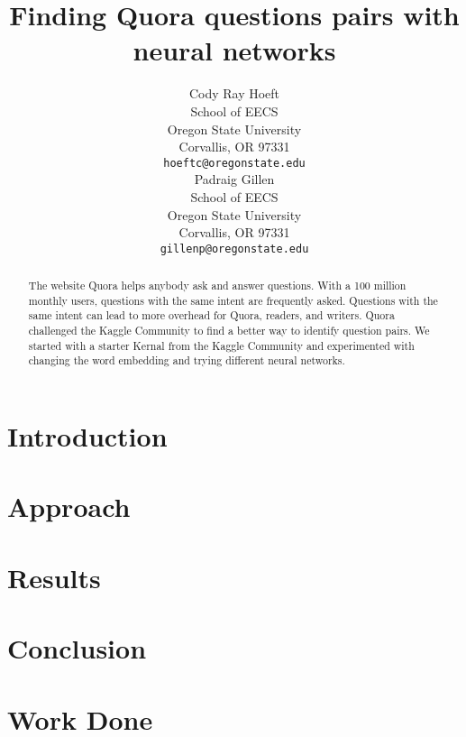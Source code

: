 \documentclass{article}
\title{Finding Quora questions pairs with neural networks}
\author{
    Cody Ray Hoeft \\
    School of EECS \\
    Oregon State University \\
    Corvallis, OR 97331 \\
    \texttt{hoeftc@oregonstate.edu} \\
    \And
    Padraig Gillen \\
    School of EECS \\
    Oregon State University \\
    Corvallis, OR 97331 \\
    \texttt{gillenp@oregonstate.edu} \\
}
\begin{document}

\maketitle

\begin{abstract}
    The website Quora helps anybody ask and answer questions. With a 100 million monthly users, questions with the same intent are frequently asked. Questions with the same intent can lead to more overhead for Quora, readers, and writers. Quora challenged the Kaggle Community to find a better way to identify question pairs. We started with a starter Kernal from the Kaggle Community and experimented with changing the word embedding and trying different neural networks.
\end{abstract}

\section{Introduction}

\section{Approach}


\section{Results}

\section{Conclusion}

\appendix
\section{Work Done}
\end{document}
